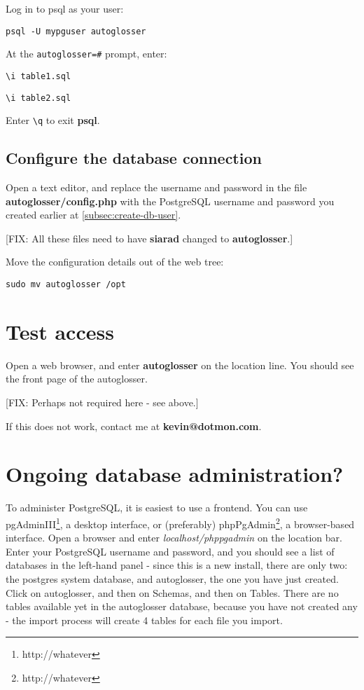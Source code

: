 \documentclass[a4paper,10pt]{article}
\begin{document}
Log in to psql as your user:

\texttt{psql -U mypguser autoglosser}

At the \verb|autoglosser=#| prompt, enter:

\verb|\i table1.sql|

\verb|\i table2.sql|

Enter \verb|\q| to exit \textbf{psql}.

\subsection{Configure the database connection}

Open a text editor, and replace the username and password in the file \textbf{autoglosser/config.php} with the PostgreSQL username and password you created earlier at \ref{subsec:create-db-user}.

[FIX: All these files need to have \textbf{siarad} changed to \textbf{autoglosser}.]

Move the configuration details out of the web tree:

\texttt{sudo mv autoglosser /opt}

\section{Test access}

Open a web browser, and enter \textbf{autoglosser} on the location line.  You should see the front page of the autoglosser.

[FIX: Perhaps not required here - see above.]

If this does not work, contact me at \textbf{kevin@dotmon.com}.

\section{Ongoing database administration?}

To administer PostgreSQL, it is easiest to use a frontend.  You can use pgAdminIII\footnote{http://whatever}, a desktop interface, or (preferably) phpPgAdmin\footnote{http://whatever}, a browser-based interface.  Open a browser and enter \textit{localhost/phppgadmin} on the location bar.  Enter your PostgreSQL username and password, and you should see a list of databases in the left-hand panel - since this is a new install, there are only two: the postgres system database, and autoglosser, the one you have just created.  Click on autoglosser, and then on Schemas, and then on Tables.  There are no tables available yet in the autoglosser database, because you have not created any - the import process will create 4 tables for each file you import. 
\end{document}

